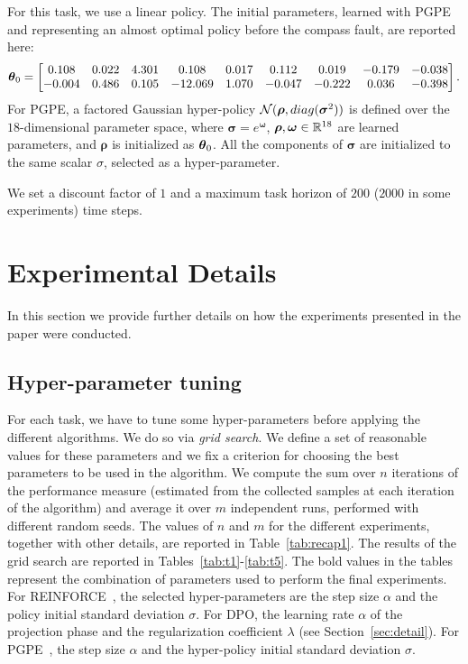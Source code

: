 For this task, we use a linear policy. The initial parameters, learned with PGPE and representing an almost optimal policy before the compass fault, are reported here:
\[
\boldsymbol{\theta}_{0} = 
\begin{bmatrix}
0.108& 0.022& 4.301& 0.108& 0.017& 0.112& 0.019& -0.179& -0.038\\
-0.004& 0.486& 0.105& -12.069& 1.070& -0.047& -0.222& 0.036& -0.398\\
\end{bmatrix}.
\]
For PGPE, a factored Gaussian hyper-policy $\mathcal{N}(\boldsymbol{\rho},\mathop{diag}(\boldsymbol{\sigma}^2))$ is defined over the $18$-dimensional parameter space, where $\boldsymbol{\sigma}=e^{\boldsymbol{\omega}}$, $\boldsymbol{\rho},\boldsymbol{\omega}\in\mathbb{R}^{18}$ are learned parameters, and $\boldsymbol{\rho}$ is initialized as $\boldsymbol{\theta}_{0}$. All the components of $\boldsymbol{\sigma}$ are initialized to the same scalar $\sigma$, selected as a hyper-parameter.

We set a discount factor of $1$ and a maximum task horizon of $200$ ($2000$ in some experiments) time steps.


\section{Experimental Details}\label{sec:app4}

In this section we provide further details on how the experiments presented in the paper were conducted. 

\subsection{Hyper-parameter tuning}
For each task, we have to tune some hyper-parameters before applying the different algorithms. We do so via \emph{grid search}. We define a set of reasonable values for these parameters and we fix a criterion for choosing the best parameters to be used in the algorithm. We compute the sum over $n$ iterations of the performance measure (estimated from the collected samples at each iteration of the algorithm) and average it over $m$ independent runs, performed with different random seeds. 
The values of $n$ and $m$ for the different experiments, together with other details, are reported in Table~\ref{tab:recap1}.
The results of the grid search are reported in Tables~\ref{tab:t1}-\ref{tab:t5}.
The bold values in the tables represent the combination of parameters used to perform the final experiments. For REINFORCE~\citep{williams1992simple}, the selected hyper-parameters are the step size $\alpha$ and the policy initial standard deviation $\sigma$. For DPO, the learning rate $\alpha$ of the projection phase and the regularization coefficient $\lambda$ (see Section~\ref{sec:detail}). For PGPE~\citep{sehnke2008policy}, the step size $\alpha$ and the hyper-policy initial standard deviation $\sigma$.


